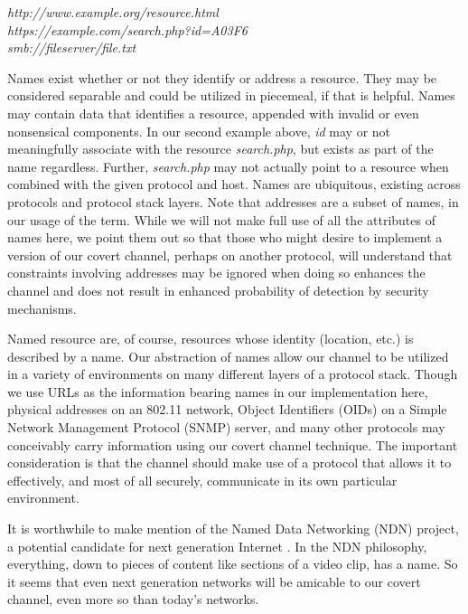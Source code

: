 \documentclass[10pt, conference]{IEEEtran}
\begin{document}
\begin{center}
  {\em http://www.example.org/resource.html}\\
  \vspace{2mm}
  {\em https://example.com/search.php?id=A03F6}\\
  \vspace{2mm}
  {\em smb://fileserver/file.txt}\\
\end{center}

Names exist whether or not they identify or address a resource.  They may be considered separable and could be utilized in piecemeal, if that is helpful.  Names may contain data that identifies a resource, appended with invalid or even nonsensical components.  In our second example above, {\em id} may or not meaningfully associate with the resource {\em search.php}, but exists as part of the name regardless.  Further, {\em search.php} may not actually point to a resource when combined with the given protocol and host.  Names are ubiquitous, existing across protocols and protocol stack layers.  Note that addresses are a subset of names, in our usage of the term.  While we will not make full use of all the attributes of names here, we point them out so that those who might desire to implement a version of our covert channel, perhaps on another protocol, will understand that constraints involving addresses may be ignored when doing so enhances the channel and does not result in enhanced probability of detection by security mechanisms.

Named resource are, of course, resources whose identity (location, etc.) is described by a name.  Our abstraction of names allow our channel to be utilized in a variety of environments on many different layers of a protocol stack.  Though we use URLs as the information bearing names in our implementation here, physical addresses on an 802.11 network, Object Identifiers (OIDs) on a Simple Network Management Protocol (SNMP) server, and many other protocols may conceivably carry information using our covert channel technique.  The important consideration is that the channel should make use of a protocol that allows it to effectively, and most of all securely, communicate in its own particular environment.

It is worthwhile to make mention of the Named Data Networking (NDN) project, a potential candidate for next generation Internet \cite{ndn}.  In the NDN philosophy, everything, down to pieces of content like sections of a video clip, has a name.  So it seems that even next generation networks will be amicable to our covert channel, even more so than today's networks.
\end{document}
